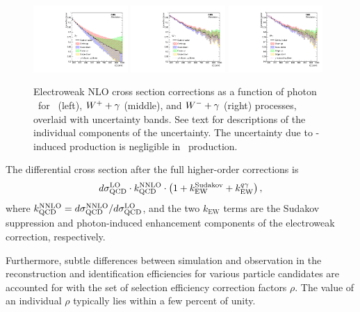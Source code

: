 \begin{figure}[htbp]
  \centering
  \includegraphics[width=0.32\textwidth]{Analysis/Figures/ewkcorr/zg.pdf}
  \includegraphics[width=0.32\textwidth]{Analysis/Figures/ewkcorr/wgplus.pdf}
  \includegraphics[width=0.32\textwidth]{Analysis/Figures/ewkcorr/wgminus.pdf}
  \caption{
    Electroweak NLO cross section corrections as a function of photon \pt\ for \zinvg\ (left), ${W}^{+}+\gamma$ (middle), and ${W}^{-}+\gamma$ (right) processes, overlaid with uncertainty bands. 
    See text for descriptions of the individual components of the uncertainty.
    The uncertainty due to \Pgg-induced production is negligible in \zinvg\ production.
  }
  \label{fig:ewk_correction}
\end{figure}

The differential cross section after the full higher-order corrections is
\begin{equation}
  d\sigma^{\text{LO}}_{\text{QCD}} \cdot k^{\text{NNLO}}_{\text{QCD}} \cdot \left(1 + k_{\text{EW}}^{\text{Sudakov}} + k_{\text{EW}}^{{q}\gamma} \right),
\end{equation}
where $k^{\text{NNLO}}_{\text{QCD}} = d\sigma^{\text{NNLO}}_{\text{QCD}} / d\sigma^{\text{LO}}_{\text{QCD}}$, and the two $k_{\text{EW}}$ terms are the Sudakov suppression and photon-induced enhancement components of the electroweak correction, respectively.

Furthermore, subtle differences between simulation and observation in the reconstruction and identification efficiencies for various particle candidates are accounted for with the set of selection efficiency correction factors $\rho$. 
The value of an individual $\rho$ typically lies within a few percent of unity. 

